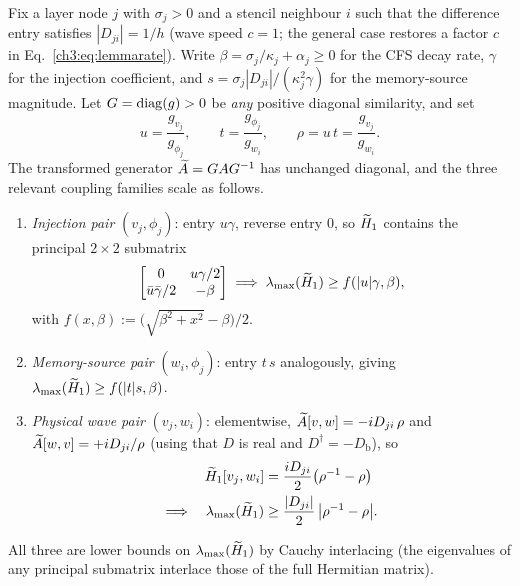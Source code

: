 Fix a layer node $j$ with $\sigma_j>0$ and a stencil neighbour $i$ such
that the difference entry satisfies $|D_{ji}|=1/h$ (wave speed $c=1$;
the general case restores a factor $c$ in Eq.~\eqref{ch3:eq:lemmarate}).
Write $\beta=\sigma_j/\kappa_j+\alpha_j\ge0$ for the CFS decay rate,
$\gamma$ for the injection coefficient, and
$s=\sigma_j|D_{ji}|/(\kappa_j^{2}\gamma)$ for the memory-source
magnitude.  Let $G=\operatorname{diag}(g)>0$ be \emph{any} positive diagonal
similarity, and set
\begin{equation}
  u=\frac{g_{v_j}}{g_{\phi_j}}, \qquad
  t=\frac{g_{\phi_j}}{g_{w_i}}, \qquad
  \rho=u\,t=\frac{g_{v_j}}{g_{w_i}}.
  \label{ch3:eq:scalings}
\end{equation}
The transformed generator $\widetilde{A} = GAG^{-1}$ has unchanged diagonal, and
the three relevant coupling families scale as follows.
\begin{enumerate}
\item[(i)] \emph{Injection pair} $(v_j,\phi_j)$: entry $u\gamma$, reverse
  entry $0$, so $\widetilde{H}_1$ contains the principal $2\times2$ submatrix
  \begin{equation}
    \begin{bmatrix} 0 & u\gamma/2 \\ \bar u\bar\gamma/2 & -\beta
    \end{bmatrix}
    \;\Longrightarrow\;
    \lambda_{\max}(\widetilde{H}_1) \ge f(|u|\gamma,\beta),
  \end{equation}
  with $f(x,\beta):=\bigl(\sqrt{\beta^{2}+x^{2}}-\beta\bigr)/2$.
\item[(ii)] \emph{Memory-source pair} $(w_i,\phi_j)$: entry $t\,s$
  analogously, giving $\lambda_{\max}(\widetilde{H}_1)\ge f(|t|s,\beta)$.
\item[(iii)] \emph{Physical wave pair} $(v_j,w_i)$: elementwise,
  $\widetilde{A}[v,w]=-iD_{ji}\,\rho$ and $\widetilde{A}[w,v]=+iD_{ji}/\rho$ (using that $D$
  is real and $D^{\dagger}=-D_{\mathrm{b}}$), so
  \begin{equation}
  \begin{split}
    \widetilde{H}_1[v_j,w_i] &= \frac{iD_{ji}}{2}\bigl(\rho^{-1}-\rho\bigr) \\
    \Longrightarrow\quad
    \lambda_{\max}(\widetilde{H}_1) &\ge \frac{|D_{ji}|}{2}\,\bigl|\rho^{-1}-\rho\bigr|.
  \end{split}
  \end{equation}
\end{enumerate}
All three are lower bounds on $\lambda_{\max}(\widetilde{H}_1)$ by Cauchy interlacing (the
eigenvalues of any principal submatrix interlace those of the full
Hermitian matrix).

